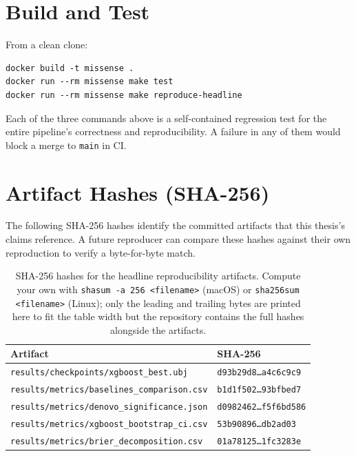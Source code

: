 \documentclass[11pt,a4paper,oneside]{report}
\begin{document}
\section{Build and Test}
From a clean clone:

\begin{verbatim}
docker build -t missense .
docker run --rm missense make test
docker run --rm missense make reproduce-headline
\end{verbatim}

Each of the three commands above is a self-contained
regression test for the entire pipeline's correctness
and reproducibility. A failure in any of them would
block a merge to \texttt{main} in CI.

\section{Artifact Hashes (SHA-256)}
\label{app:hashes}

The following SHA-256 hashes identify the committed
artifacts that this thesis's claims reference. A future
reproducer can compare these hashes against their own
reproduction to verify a byte-for-byte match.

\begin{table}[H]
\centering
\footnotesize
\begin{tabular}{@{}l l@{}}
\toprule
\textbf{Artifact} & \textbf{SHA-256} \\
\midrule
\texttt{results/checkpoints/xgboost\_best.ubj} & \texttt{d93b29d8\ldots a4c6c9c9} \\
\texttt{results/metrics/baselines\_comparison.csv} & \texttt{b1d1f502\ldots 93bfbed7} \\
\texttt{results/metrics/denovo\_significance.json} & \texttt{d0982462\ldots f5f6bd586} \\
\texttt{results/metrics/xgboost\_bootstrap\_ci.csv} & \texttt{53b90896\ldots db2ad03} \\
\texttt{results/metrics/brier\_decomposition.csv} & \texttt{01a78125\ldots 1fc3283e} \\
\bottomrule
\end{tabular}
\caption[Artifact SHA-256 hashes]{SHA-256 hashes for the
headline reproducibility artifacts. Compute your own with
\texttt{shasum -a 256 <filename>} (macOS) or
\texttt{sha256sum <filename>} (Linux); only the leading and
trailing bytes are printed here to fit the table width but
the repository contains the full hashes alongside the
artifacts.}
\label{tab:hashes}
\end{table}
\end{document}
